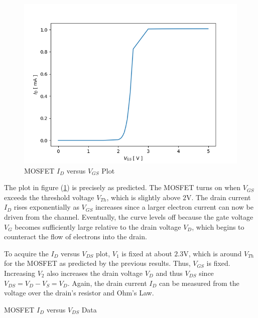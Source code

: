 \begin{figure}[h!]
	\centering
	\includegraphics[scale=0.75]{./images/mosfet_id_vgs.PNG}
	\caption{MOSFET $I_D$ versus $V_{GS}$ Plot}
	\label{fig:mosfet_id_vgs}
\end{figure}

\FloatBarrier

The plot in figure (\ref{fig:mosfet_id_vgs}) is precisely as predicted. The MOSFET turns on when $V_{GS}$ exceeds the threshold voltage $V_{Th}$, which is slightly above $2$\si{\volt}. The drain current $I_{D}$ rises exponentially as $V_{GS}$ increases since a larger electron current can now be driven from the channel. Eventually, the curve levels off because the gate voltage $V_{G}$ becomes sufficiently large relative to the drain voltage $V_{D}$, which begins to counteract the flow of electrons into the drain.

To acquire the $I_D$ versus $V_{DS}$ plot, $V_1$ is fixed at about $2.3$\si{\volt}, which is around $V_{Th}$ for the MOSFET as predicted by the previous results. Thus, $V_{GS}$ is fixed. Increasing $V_2$ also increases the drain voltage $V_{D}$ and thus $V_{DS}$ since $V_{DS} = V_D - V_S = V_D$. Again, the drain current $I_D$ can be measured from the voltage over the drain's resistor and Ohm's Law.

\FloatBarrier

\begin{table}[h!]
	\centering
	\caption{MOSFET $I_D$ versus $V_{DS}$ Data}
	\label{tab:mosfet_id_vds}
\end{table}

